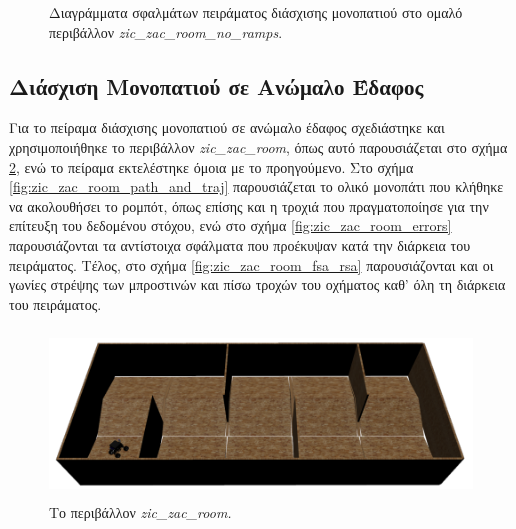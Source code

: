 \begin{figure}[!ht]
	\caption{Διαγράμματα σφαλμάτων πειράματος διάσχισης μονοπατιού στο ομαλό περιβάλλον \textit{zic{\_}zac{\_}room{\_}no{\_}ramps}.}
	\label{fig:zic_zac_room_no_ramps_errors}
\end{figure}

\FloatBarrier

\subsection{Διάσχιση Μονοπατιού σε Ανώμαλο Έδαφος}
Για το πείραμα διάσχισης μονοπατιού σε ανώμαλο έδαφος σχεδιάστηκε και χρησιμοποιήθηκε το περιβάλλον \textit{zic{\_}zac{\_}room}, όπως αυτό παρουσιάζεται στο σχήμα \ref{fig:zic_zac_room}, ενώ το πείραμα εκτελέστηκε όμοια με το προηγούμενο. Στο σχήμα \ref{fig:zic_zac_room_path_and_traj} παρουσιάζεται το ολικό μονοπάτι που κλήθηκε να ακολουθήσει το ρομπότ, όπως επίσης και η τροχιά που πραγματοποίησε για την επίτευξη του δεδομένου στόχου, ενώ στο σχήμα \ref{fig:zic_zac_room_errors} παρουσιάζονται τα αντίστοιχα σφάλματα που προέκυψαν κατά την διάρκεια του πειράματος. Τέλος, στο σχήμα \ref{fig:zic_zac_room_fsa_rsa} παρουσιάζονται και οι γωνίες στρέψης των μπροστινών και πίσω τροχών του οχήματος καθ' όλη τη διάρκεια του πειράματος.

\begin{figure}[!ht]
	\centering
	\includegraphics[height=4.5cm]{Chapters/Chapter5/Figures/ptc_experiments/zic_zac_room.png}
	\caption{Το περιβάλλον \textit{zic{\_}zac{\_}room.}}
	\label{fig:zic_zac_room}
\end{figure}	
	
